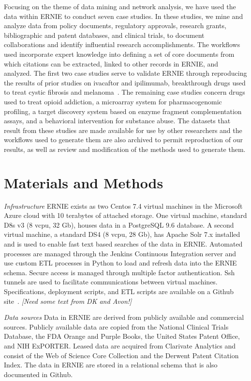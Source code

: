 \documentclass[review]{elsarticle}
\begin{document}
Focusing on the theme of data mining and network analysis, we have used the data within ERNIE to conduct seven case studies. In these studies, we mine and analyze data from policy documents, regulatory approvals, research grants, bibliographic and patent databases, and clinical trials, to document collaborations and identify influential research accomplishments. The workflows used incorporate expert knowledge into defining a set of core documents from which citations can be extracted, linked to other records in ERNIE, and analyzed. The first two case studies serve to validate ERNIE through reproducing the results of prior studies on ivacaftor and ipilimumab, breakthrough drugs used to treat cystic fibrosis and melanoma~\cite{Williams2015}. The remaining case studies concern drugs used to treat opioid addiction, a microarray system for pharmacogenomic profiling, a target discovery system based on enzyme fragment complementation assays, and a behavioral intervention for substance abuse. The datasets that result from these studies are made available for use by other researchers and the workflows used to generate them are also archived to permit reproduction of our results, as well as review and modification of the methods used to generate them. 

\section*{Materials and Methods}

\emph{Infrastructure} ERNIE exists as two Centos 7.4 virtual machines in the Microsoft Azure cloud with 10 terabytes of attached storage. One virtual machine,  standard D8s v3 (8 vcpu, 32 Gb), houses data in a PostgreSQL 9.6 database. A second virtual machine, a standard DS4 (8 vcpu, 28 Gb), has Apache Solr 7.x installed and is used to enable fast text based searches of the data in ERNIE. Automated processes are managed through the Jenkins Continuous Integration server and use custom ETL processes in Python to load and refresh data into the ERNIE schema. Secure access is managed through multiple factor authentication. Ssh tunnels are used to facilitate communications between virtual machines. Specifications, deployment scripts, and ETL scripts are available on a Github site~\cite{GithubERNIE2017}. \emph{[Need some text from DK and Avon!]}

\emph{Data sources} Data in ERNIE are derived from publicly available and commercial sources. Publicly available data are copied from the National Clinical Trials Database, the FDA Orange and Purple Books,  the United States Patent Office, and NIH ExPORTER. Leased data are acquired from Clarivate Analytics and consist of the Web of Science Core Collection and the Derwent Patent Citation Index. The data in ERNIE are stored in a relational schema that is also documented in Github. 
\end{document}
